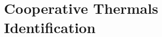 \documentclass{ifacconf}
\newcommand{\squeezeup}{\vspace{-3.0mm}}
\begin{document}
%
%

\section{Cooperative Thermals Identification }
\label{sec:CoopAlgs}
\squeezeup
\end{document}
